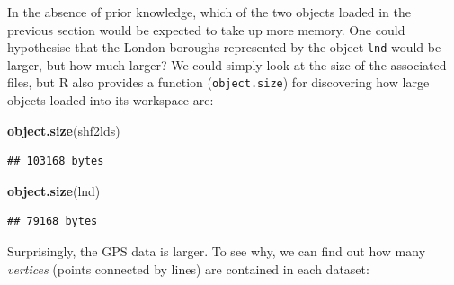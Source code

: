 \documentclass[]{article}
\newenvironment{Shaded}{}{}
\newcommand{\KeywordTok}[1]{\textcolor[rgb]{0.00,0.44,0.13}{\textbf{{#1}}}}
\newcommand{\NormalTok}[1]{{#1}}
\begin{document}
In the absence of prior knowledge, which of the two objects loaded in
the previous section would be expected to take up more memory. One could
hypothesise that the London boroughs represented by the object
\texttt{lnd} would be larger, but how much larger? We could simply look
at the size of the associated files, but R also provides a function
(\texttt{object.size}) for discovering how large objects loaded into its
workspace are:

\begin{Shaded}
\begin{Highlighting}[]
\KeywordTok{object.size}\NormalTok{(shf2lds)}
\end{Highlighting}
\end{Shaded}
\begin{verbatim}
## 103168 bytes
\end{verbatim}
\begin{Shaded}
\begin{Highlighting}[]
\KeywordTok{object.size}\NormalTok{(lnd)}
\end{Highlighting}
\end{Shaded}
\begin{verbatim}
## 79168 bytes
\end{verbatim}
Surprisingly, the GPS data is larger. To see why, we can find out how
many \emph{vertices} (points connected by lines) are contained in each
dataset:
\end{document}
